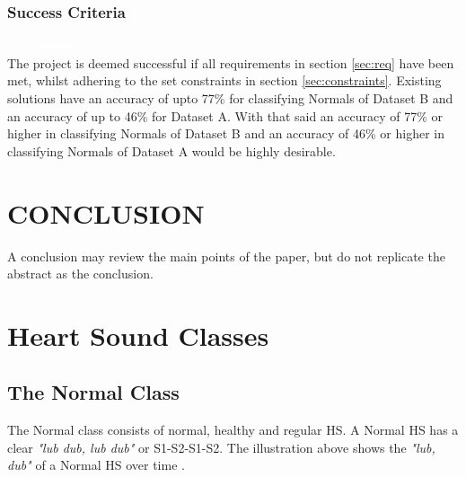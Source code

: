 \documentclass[10pt,twocolumn]{witseiepaper}
\begin{document}
\subsubsection{Success Criteria}
\textcolor{white}{O re swarele...}\\
The project is deemed successful if all requirements in section \ref{sec:req} have been met,
whilst adhering to the set constraints in section \ref{sec:constraints}. Existing solutions
have an accuracy of upto 77\% for classifying Normals of Dataset B and an accuracy of up to 46\%
for Dataset A. With that said an accuracy of 77\% or higher in classifying Normals of Dataset B and
an accuracy of 46\% or higher in classifying Normals of Dataset A would be highly desirable.
\section{CONCLUSION}

A conclusion may review the main points of the paper, but do not replicate the
abstract as the conclusion.




%







\appendix
\section{Heart Sound Classes}
\label{HS}

\subsection*{The Normal Class}
The Normal class consists of normal, healthy and regular HS. A Normal HS has a clear \textit{"lub dub, lub dub"} or S1-S2-S1-S2. The illustration above shows the \textit{"lub, dub"} of a Normal HS over time \cite{bentley}.
\end{document}
